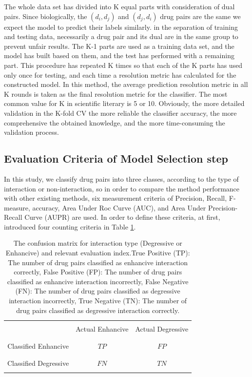 \documentclass{bmcart}
\begin{document}
The whole data set has divided into K equal parts with consideration of dual pairs. Since biologically, the $(d_i, d_j)$ and $(d_j, d_i)$ drug pairs are the same we expect the model to predict their labels similarly.  in the separation of training and testing data, necessarily a drug pair and its dual are in the same group to prevent unfair results. The K-1 parts are used as a training data set, and the model has built based on them, and the test has performed with a remaining part. This procedure has repeated K times so that each of the K parts has used only once for testing, and each time a resolution metric has calculated for the constructed model. In this method, the average prediction resolution metric in all K rounds is taken as the final resolution metric for the classifier. The most common value for K in scientific literary is 5 or 10. Obviously, the more detailed validation in the K-fold CV the more reliable the classifier accuracy, the more comprehensive the obtained knowledge, and the more time-consuming the validation process.


\subsection*{Evaluation Criteria of Model Selection step}
In this study, we classify drug pairs into three classes, according to the type of interaction or non-interaction, so in order to compare the method performance with other existing methods, six measurement criteria of Precision, Recall, F- measure, accuracy, Area Under Roc Curve (AUC), and Area Under Precision-Recall Curve (AUPR) are used. In order to define these criteria, at first, introduced four counting criteria in Table \ref{confusion_matrix_enh_deg}.

\begin{table}[h!]
	\centering
	\begin{tabular}{|c|c|c|}
		\cline{2-3}
		\multicolumn{1}{c|}{}&&\\
		\multicolumn{1}{c|}{} & Actual Enhancive & Actual Degressive \\
		\multicolumn{1}{c|}{}&&\\
		\cline{1-3}
		&&\\
		Classified Enhancive & $TP$	 & $FP$\\
		&&\\
		\cline{1-3}
		&&\\
		Classified Degressive & $FN$ & $TN$\\
		&&\\
		\cline{1-3}
	\end{tabular}
	\newline
	\caption{The confusion matrix for interaction type (Degressive or Enhancive) and relevant evaluation index.True Positive (TP): The number of drug pairs classified as enhancive interaction correctly, False Positive (FP): The number of drug pairs classified as enhancive interaction incorrectly, False Negative (FN): The number of drug pairs classified as degressive interaction incorrectly, True Negative (TN): The number of drug pairs classified as degressive interaction correctly.}
	\label{confusion_matrix_enh_deg}
\end{table}
\end{document}
